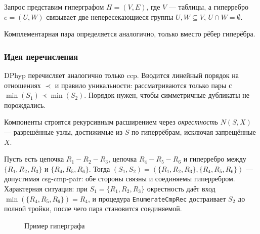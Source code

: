 Запрос представим гиперграфом $H=(V,E)$, где $V$ --- таблицы, а гиперребро $e=(U,W)$ связывает две непересекающиеся группы $U,W\subseteq V$, $U\cap W=\emptyset$.
\par

Комплементарная пара определяется аналогично, только вместо рёбер гиперёбра.


\subsubsection{Идея перечисления}

DPhyp перечисляет аналогично только ccp.
Вводится линейный порядок на отношениях $\prec$ и правило уникальности: рассматриваются только пары с $\min(S_1)\prec \min(S_2)$. Порядок нужен, чтобы симметричные дубликаты не порождались.
\par

Компоненты строятся рекурсивным расширением через \emph{окрестность} $N(S,X)$ --- разрешённые узлы, достижимые из $S$ по гиперрёбрам, исключая запрещённые $X$.
\par

Пусть есть цепочка $R_1\!-\!R_2\!-\!R_3$, цепочка $R_4\!-\!R_5\!-\!R_6$ и гиперребро между $\{R_1,R_2,R_3\}$ и $\{R_4,R_5,R_6\}$.
Тогда $(S_1,S_2)=(\{R_1,R_2,R_3\},\{R_4,R_5,R_6\})$ --- допустимая csg-cmp-pair: обе стороны связны и соединяемы гиперребром.
Характерная ситуация: при $S_1=\{R_1,R_2,R_3\}$ окрестность даёт вход $\min(\{R_4,R_5,R_6\})=R_4$, и процедура \texttt{EnumerateCmpRec} достраивает $S_2$ до полной тройки, после чего пара становится соединяемой.

\begin{figure}[t]
\centering
{}
\caption{Пример гиперграфа}
\label{fig:dphyp-sample-hypergraph}
\end{figure}

